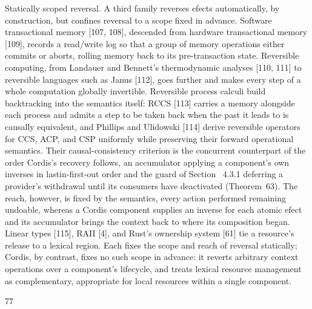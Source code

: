 \documentclass[
  10
]{article}
\begin{document}
Statically scoped reversal. A third family reverses efects
automatically, by construction, but confines reversal to a scope fixed
in advance. Software transactional memory {[}107, 108{]}, descended from
hardware transactional memory {[}109{]}, records a read/write log so
that a group of memory operations either commits or aborts, rolling
memory back to its pre-transaction state. Reversible computing, from
Landauer and Bennett's thermodynamic analyses {[}110, 111{]} to
reversible languages such as Janus {[}112{]}, goes further and makes
every step of a whole computation globally invertible. Reversible
process calculi build backtracking into the semantics itself: RCCS
{[}113{]} carries a memory alongside each process and admits a step to
be taken back when the past it leads to is causally equivalent, and
Phillips and Ulidowski {[}114{]} derive reversible operators for CCS,
ACP, and CSP uniformly while preserving their forward operational
semantics. Their causal-consistency criterion is the concurrent
counterpart of the order Cordis's recovery follows, an accumulator
applying a component's own inverses in lastin-first-out order and the
guard of Section~ 4.3.1 deferring a provider's withdrawal until its
consumers have deactivated (Theorem~63). The reach, however, is fixed by
the semantics, every action performed remaining undoable, whereas a
Cordis component supplies an inverse for each atomic efect and its
accumulator brings the context back to where its composition began.
Linear types {[}115{]}, RAII {[}4{]}, and Rust's ownership system
{[}61{]} tie a resource's release to a lexical region. Each fixes the
scope and reach of reversal statically; Cordis, by contrast, fixes no
such scope in advance: it reverts arbitrary context operations over a
component's lifecycle, and treats lexical resource management as
complementary, appropriate for local resources within a single
component.

77
\end{document}
